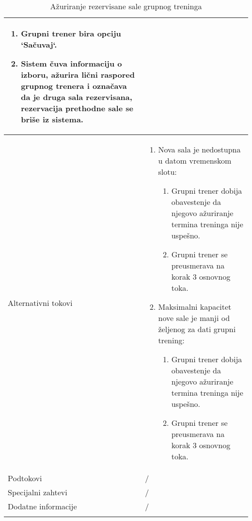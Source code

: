 \documentclass[../grupniTreninzi.tex]{subfiles}
\begin{document}
\begin{longtable}{| p{} | p{} |}
\begin{enumerate}
        \item Grupni trener bira opciju `Sačuvaj`.
        \item Sistem čuva informaciju o izboru, ažurira lični raspored grupnog trenera i označava da je druga sala rezervisana, rezervacija prethodne sale se briše iz sistema.
    \end{enumerate}\\
\hline
    Alternativni tokovi & 
       \begin{enumerate}
        \item Nova sala je nedostupna u datom vremenskom slotu: 
            \begin{enumerate}
                \item Grupni trener dobija obavestenje da njegovo ažuriranje termina treninga nije uspešno.
                \item Grupni trener se preusmerava na korak 3 osnovnog toka.
            \end{enumerate}
        \item Maksimalni kapacitet nove sale je manji od željenog za dati grupni trening:
            \begin{enumerate}
                \item Grupni trener dobija obavestenje da njegovo ažuriranje termina treninga nije uspešno.
                \item Grupni trener se preusmerava na korak 3 osnovnog toka.
            \end{enumerate}
    \end{enumerate}\\
\hline
    Podtokovi & /\\
\hline
    Specijalni zahtevi & /\\
\hline
    Dodatne informacije & /\\
\hline
\caption{Ažuriranje rezervisane sale grupnog treninga} %
\end{longtable}
\end{document}
